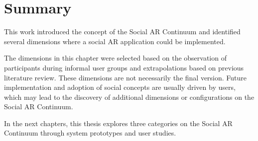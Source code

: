



\section{Summary}

This work introduced the concept of the Social AR Continuum and identified several dimensions where a social AR application could be implemented. 

The dimensions in this chapter were selected based on the observation of participants during informal user groups and extrapolations based on previous literature review. These dimensions are not necessarily the final version. Future implementation and adoption of social concepts are usually driven by users, which may lead to the discovery of additional dimensions or configurations on the Social AR Continuum. 


In the next chapters, this thesis explores three categories on the Social AR Continuum through system prototypes and user studies.


